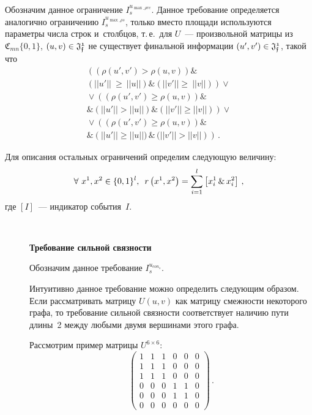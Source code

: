 \begin{multicols}{2}
\begin{description}
Обозначим данное ограничение $I_s^{u_{\max\_\rho rc}}$. Данное требование 
определяется аналогично ограниче\-нию $I_s^{u_{\max\_\rho s}}$, только вместо 
площади используются параметры числа строк и~столбцов, т.\,е.\ для $U$~--- 
произвольной матрицы из $\mathfrak{C}_{mn}\{0,1\}$, $(u,v) \hm\in  
\mathfrak{J_f^1}$ не существует финальной информации  $(u',v') \hm\in  
\mathfrak{J_f^1}$, такой что
\begin{multline*}
\left (\left(\rho(u',v') > \rho(u,v)\right)   \& \right. \\  
\left.\left(||u'||~\geq~||u||\right)  \&  \left(||v'||\geq~||v||\right) \right) 
\vee{} \\ 
{}\vee \left( \left(\rho(u',v') \geq \rho(u,v)\right)  \& \right. \\ 
\left.\&   \left(||u'|| > ||u||\right)  \&  \left(||v'||\geq ||v||\right) \right) 
\vee{} \\ 
{}\vee \left( \left(\rho(u',v') \geq \rho(u,v)\right) \& \right.\\ 
\left.\&  \left(||u'|| \ge ||u||\bigr) \, \& \, \bigl(||v'|| > ||v||\right) \right)\,.
\end{multline*}
\end{description}



Для описания остальных ограничений определим следующую величину: 
$$
\forall\ x^1, 
x^2  \in \{0,1\}^l,\enskip r\left(x^1, x^2\right) = \sum\limits_{i=1}^l 
\left[ x^1_i\, \&\, x^2_i\right]\,,
$$ 
где $[I]$~--- индикатор 
события~$I$.

\begin{description}
\item[\,] \textbf{Требование сильной связности}

Обозначим данное требование $I_s^{u_{con_s}}$.

Интуитивно данное требование можно определить следующим образом. Если 
рассматривать матрицу $U(u,v)$ как матрицу смежности некоторого графа, то 
требование сильной связности соответствует наличию пути длины~2 между любыми 
двумя вершинами этого графа.

Рассмотрим пример матрицы $U^{6\times 6}$:
$$
\begin{pmatrix} 
1 & 1 & 1 & 0 & 0 & 0 \\ 
1 & 1 & 1 & 0 & 0 & 0 \\
 1 & 1 & 1 & 0 & 0 & 0\\
0 & 0 & 0 & 1 & 1 & 0 \\ 
0 & 0 & 0 & 1 & 1 & 0 \\ 
0 & 0 & 0 & 0 & 0 & 
0 \end{pmatrix}\,.
$$


\end{description}
\end{multicols}
